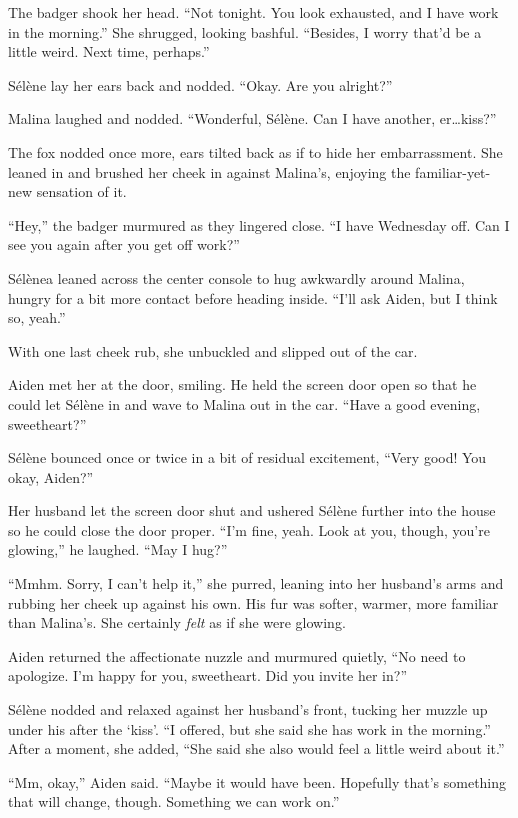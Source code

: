 The badger shook her head. ``Not tonight. You look exhausted, and I have work in the morning.'' She shrugged, looking bashful. ``Besides, I worry that'd be a little weird. Next time, perhaps.''

Sélène lay her ears back and nodded. ``Okay. Are you alright?''

Malina laughed and nodded. ``Wonderful, Sélène. Can I have another, er\ldots{}kiss?''

The fox nodded once more, ears tilted back as if to hide her embarrassment. She leaned in and brushed her cheek in against Malina's, enjoying the familiar-yet-new sensation of it.

``Hey,'' the badger murmured as they lingered close. ``I have Wednesday off. Can I see you again after you get off work?''

Sélènea leaned across the center console to hug awkwardly around Malina, hungry for a bit more contact before heading inside. ``I'll ask Aiden, but I think so, yeah.''

With one last cheek rub, she unbuckled and slipped out of the car.

Aiden met her at the door, smiling. He held the screen door open so that he could let Sélène in and wave to Malina out in the car. ``Have a good evening, sweetheart?''

Sélène bounced once or twice in a bit of residual excitement, ``Very good! You okay, Aiden?''

Her husband let the screen door shut and ushered Sélène further into the house so he could close the door proper. ``I'm fine, yeah. Look at you, though, you're glowing,'' he laughed. ``May I hug?''

``Mmhm. Sorry, I can't help it,'' she purred, leaning into her husband's arms and rubbing her cheek up against his own. His fur was softer, warmer, more familiar than Malina's. She certainly \emph{felt} as if she were glowing.

Aiden returned the affectionate nuzzle and murmured quietly, ``No need to apologize. I'm happy for you, sweetheart. Did you invite her in?''

Sélène nodded and relaxed against her husband's front, tucking her muzzle up under his after the `kiss'. ``I offered, but she said she has work in the morning.'' After a moment, she added, ``She said she also would feel a little weird about it.''

``Mm, okay,'' Aiden said. ``Maybe it would have been. Hopefully that's something that will change, though. Something we can work on.''

